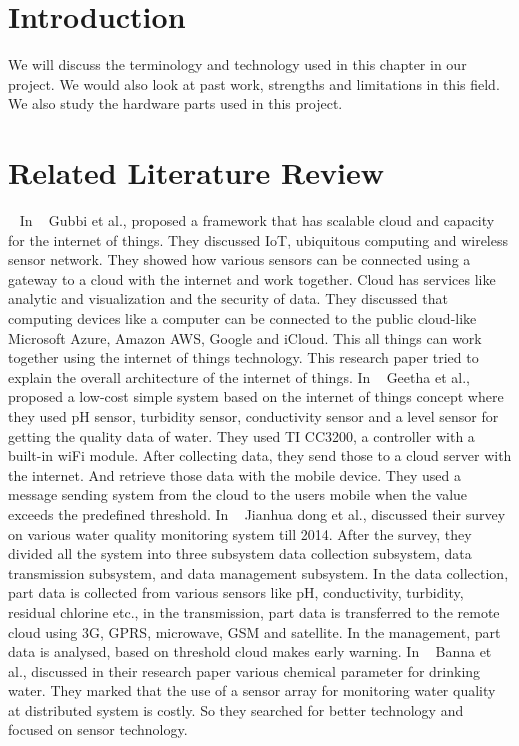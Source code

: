 \section{Introduction}
We will discuss the terminology and technology used in this chapter in our project. We would also look at past work, strengths and limitations in this field. We also study the hardware parts used in this project.
\section{Related Literature Review}
~\cite{cloete2016design}
In ~\cite{gubbi2013internet} Gubbi et al., proposed a framework that has scalable cloud and capacity for the internet of things. They discussed IoT, ubiquitous computing and wireless sensor network. They showed how various sensors can be connected using a gateway to a cloud with the internet and work together. Cloud has services like analytic and visualization and the security of data. They discussed that computing devices like a computer can be connected to the public cloud-like Microsoft Azure, Amazon AWS, Google and iCloud. This all things can work together using the internet of things technology. This research paper tried to explain the overall architecture of the internet of things.
In ~\cite{geetha2016internet} Geetha et al., proposed a low-cost simple system based on the internet of things concept where they used pH sensor, turbidity sensor, conductivity sensor and a level sensor for getting the quality data of water. They used TI CC3200, a controller with a built-in wiFi module. After collecting data, they send those to a cloud server with the internet. And retrieve those data with the mobile device. They used a message sending system from the cloud to the users mobile when the value exceeds the predefined threshold.
In ~\cite{dong2015survey} Jianhua dong et al., discussed their survey on various water quality monitoring system till 2014. After the survey, they divided all the system into three subsystem data collection subsystem, data
transmission subsystem, and data management subsystem. In the data collection, part data is collected from various sensors like pH, conductivity, turbidity, residual chlorine etc., in the transmission, part data is transferred to the remote cloud using 3G, GPRS, microwave, GSM and satellite. In the management, part data is analysed, based on threshold cloud makes early warning.
In ~\cite{banna2014online} Banna et al., discussed in their research paper various chemical parameter for drinking water. They marked that the use of a sensor array for monitoring water quality at distributed system is costly. So they searched for better technology and focused on sensor technology.
